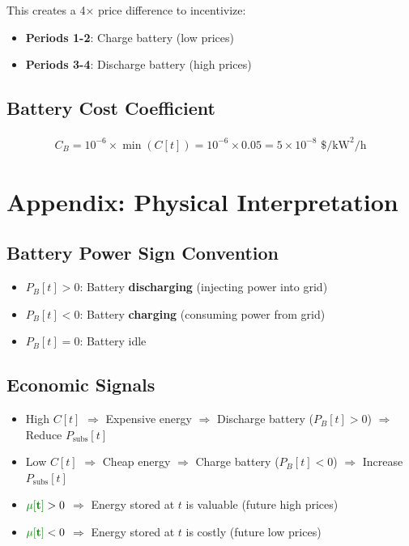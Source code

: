 \documentclass[11pt]{article}
\newcommand{\greenmu}[1]{\textcolor{greenvar}{\mathbf{#1}}}   %
\begin{document}
This creates a 4× price difference to incentivize:
\begin{itemize}
    \item \textbf{Periods 1-2}: Charge battery (low prices)
    \item \textbf{Periods 3-4}: Discharge battery (high prices)
\end{itemize}

\subsection{Battery Cost Coefficient}
\begin{align}
C_B = 10^{-6} \times \min(C[t]) = 10^{-6} \times 0.05 = 5 \times 10^{-8} \text{ \$/kW}^2\text{/h}
\end{align}

\section{Appendix: Physical Interpretation}

\subsection{Battery Power Sign Convention}
\begin{itemize}
    \item $P_B[t] > 0$: Battery \textbf{discharging} (injecting power into grid)
    \item $P_B[t] < 0$: Battery \textbf{charging} (consuming power from grid)
    \item $P_B[t] = 0$: Battery idle
\end{itemize}

\subsection{Economic Signals}
\begin{itemize}
    \item High $C[t]$ $\Rightarrow$ Expensive energy $\Rightarrow$ Discharge battery ($P_B[t] > 0$) $\Rightarrow$ Reduce $P_{\text{subs}}[t]$
    \item Low $C[t]$ $\Rightarrow$ Cheap energy $\Rightarrow$ Charge battery ($P_B[t] < 0$) $\Rightarrow$ Increase $P_{\text{subs}}[t]$
    \item $\greenmu{\mu[t]} > 0$ $\Rightarrow$ Energy stored at $t$ is valuable (future high prices)
    \item $\greenmu{\mu[t]} < 0$ $\Rightarrow$ Energy stored at $t$ is costly (future low prices)
\end{itemize}
\end{document}
